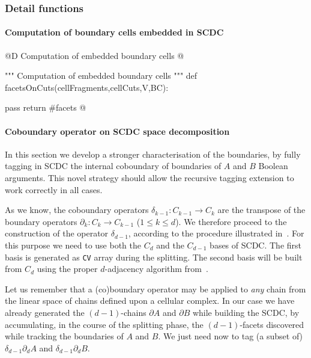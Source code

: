 \documentclass[11pt,oneside]{article}	%
\begin{document}
\subsubsection{Detail functions}



\paragraph{Computation of boundary cells embedded in SCDC}

@D Computation of embedded boundary cells
@{""" Computation of embedded boundary cells """
def facetsOnCuts(cellFragments,cellCuts,V,BC):


	pass
	return #facets
@}


\paragraph{Coboundary operator on SCDC space decomposition}

In this section we develop a stronger characterisation of the boundaries, by fully tagging in SCDC the internal coboundary of boundaries of $A$ and $B$ Boolean arguments. This novel strategy should allow the recursive tagging extension to work correctly in all cases.

As we know, the  coboundary operators $\delta_{k-1}: C_{k-1} \to C_k$ are the transpose of the boundary operators $\partial_k: C_k \to C_{k-1}$ ($1\leq k\leq d$). We therefore proceed to the construction of the operator $\delta_{d-1}$, according to the procedure illustrated in~\cite{}. For this purpose we need to use both the $C_d$ and the $C_{d-1}$ bases of SCDC. The first basis is generated as \texttt{CV} array during the splitting. The second basis will be built from $C_d$ using the proper $d$-adjacency algorithm from~\cite{}. 

Let us remember that a (co)boundary operator may be applied to \emph{any} chain from the linear space of chains defined upon a cellular complex. 
In our case we have already generated the $(d-1)$-chains $\partial A$ and $\partial B$ while building the SCDC, by accumulating, in the course of the splitting phase, the $(d-1)$-facets discovered while tracking the boundaries of $A$ and $B$. We just need now to tag (a subset of) $\delta_{d-1}\partial_d A$ and $\delta_{d-1}\partial_d B$.
\end{document}
